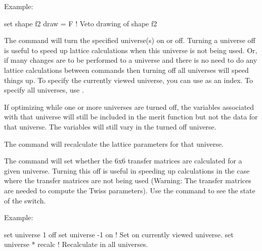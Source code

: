 {{\begin{description}
Example:
\begin{example}
  set shape f2 draw = F  ! Veto drawing of shape f2 
\end{example}


\item[\protect\parbox{6in}{
        set universe <what\_universe> <on/off> \\ 
        set universe <what\_universe> recalculate \\
        set universe <what\_universe> mat6\_recalc <on/off>}] \Newline
The  command will turn the
specified universe(s) on or off. Turning a universe off is useful to
speed up lattice calculations when this universe is not being
used. Or, if many changes are to be performed to a universe and there
is no need to do any lattice calculations between commands then
turning off all universes will speed things up. To specify the
currently viewed universe, you can use  as an index.  To
specify all universes, use \vn{*}.

If optimizing while one or more universes are turned off, the
variables associated with that universe will still be included in the
merit function but not the data for that universe. The variables will
still vary in the turned off universe.

The  command will recalculate the
lattice parameters for that universe.

The  command will set whether
the 6x6 transfer matrices are calculated for a given universe. Turning
this off is useful in speeding up calculations in the case where the
transfer matrices are not being used (Warning: The transfer matrices
are needed to compute the Twiss parameters). Use the  command to see the state of the  switch.

Example:
\begin{example}
  set universe 1 off
  set universe -1 on    ! Set on currently viewed universe.
  set universe * recalc ! Recalculate in all universes.
\end{example}



\end{description}}}
